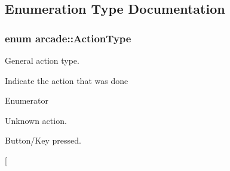 \subsection{Enumeration Type Documentation}
\hypertarget{namespacearcade_a1b6c05b243c7e94d71fb328705e619bd}{
\subsubsection[{Action\-Type}]{\setlength{\rightskip}{0pt plus 5cm}enum {\bf arcade\-::\-Action\-Type}}}\label{namespacearcade_a1b6c05b243c7e94d71fb328705e619bd}


General action type. 

Indicate the action that was done \begin{Desc}
\item[Enumerator]\par
\begin{description}
\item[{\em 
\hypertarget{namespacearcade_a1b6c05b243c7e94d71fb328705e619bdaac3c7c13e932f57d116c97d454019c5d}{A\-T\-\_\-\-N\-O\-N\-E}\label{namespacearcade_a1b6c05b243c7e94d71fb328705e619bdaac3c7c13e932f57d116c97d454019c5d}
}]\item[{\em 
\hypertarget{namespacearcade_a1b6c05b243c7e94d71fb328705e619bda64dc691d8dfa7dc0571d226b42dfea6e}{A\-T\-\_\-\-P\-R\-E\-S\-S\-E\-D}\label{namespacearcade_a1b6c05b243c7e94d71fb328705e619bda64dc691d8dfa7dc0571d226b42dfea6e}
}]Unknown action. \item[{\em 
\hypertarget{namespacearcade_a1b6c05b243c7e94d71fb328705e619bda8e0c4a910dc5fc07e5231bad0052ddec}{A\-T\-\_\-\-R\-E\-L\-E\-A\-S\-E\-D}\label{namespacearcade_a1b6c05b243c7e94d71fb328705e619bda8e0c4a910dc5fc07e5231bad0052ddec}
}]Button/\-Key pressed. \item[{\em 
}
\end{description}
\end{Desc}
